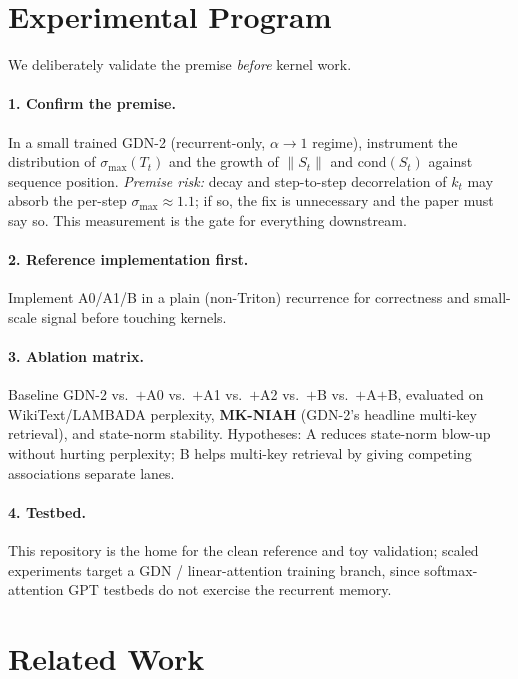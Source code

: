 \documentclass[11pt,letterpaper,logo]{yalearxiv}
\newcommand{\smax}{\sigma_{\max}}
\newcommand{\Tcarry}{T}          %
\begin{document}
\section{Experimental Program}
\label{sec:exp}

We deliberately validate the premise \emph{before} kernel work.

\paragraph{1. Confirm the premise.} In a small trained GDN-2 (recurrent-only,
$\alpha\to1$ regime), instrument the distribution of $\smax(\Tcarry_t)$ and the
growth of $\|S_t\|$ and $\mathrm{cond}(S_t)$ against sequence position. \emph{Premise
risk:} decay and step-to-step decorrelation of $k_t$ may absorb the per-step
$\smax\approx1.1$; if so, the fix is unnecessary and the paper must say so. This
measurement is the gate for everything downstream.

\paragraph{2. Reference implementation first.} Implement A0/A1/B in a plain
(non-Triton) recurrence for correctness and small-scale signal before touching
kernels.

\paragraph{3. Ablation matrix.} Baseline GDN-2 vs.\ $+$A0 vs.\ $+$A1 vs.\ $+$A2 vs.\
$+$B vs.\ $+$A$+$B, evaluated on WikiText/LAMBADA perplexity, \textbf{MK-NIAH}
(GDN-2's headline multi-key retrieval), and state-norm stability. Hypotheses: A
reduces state-norm blow-up without hurting perplexity; B helps multi-key retrieval by
giving competing associations separate lanes.

\paragraph{4. Testbed.} This repository is the home for the clean reference and toy
validation; scaled experiments target a GDN / linear-attention training branch, since
softmax-attention GPT testbeds do not exercise the recurrent memory.


\section{Related Work}
\label{sec:related}
\end{document}
